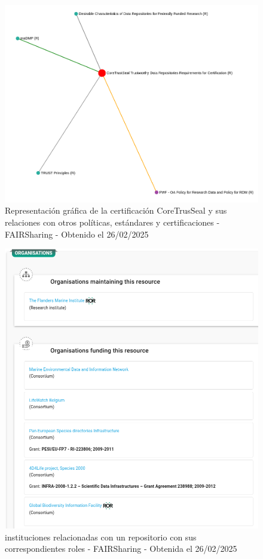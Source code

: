 \documentclass[runningheads]{llncs}
\begin{document}
\begin{figure}
    \centering
    \includegraphics[width=0.5\linewidth]{img/certificates_relations.png}
    \caption{Representación gráfica de la certificación CoreTrusSeal y sus relaciones con otros políticas, estándares y certificaciones - FAIRSharing - Obtenido el 26/02/2025}
    \label{fig:certificates_relations}
\end{figure}



\begin{figure}
    \centering
    \includegraphics[width=0.5\linewidth]{img/fairsharing_institutions.png}
    \caption{instituciones relacionadas con un repositorio con sus correspondientes roles - FAIRSharing - Obtenida el 26/02/2025}
    \label{fig:fairsharing_institutions}
\end{figure}
\end{document}

